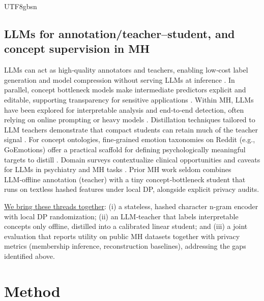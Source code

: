 \documentclass[lettersize,journal]{IEEEtran}
\begin{document}
\begin{CJK*}{UTF8}{gbsn}
\subsection{LLMs for annotation/teacher–student, and concept supervision in MH}
LLMs can act as high‑quality annotators and teachers, enabling low‑cost label generation and model compression without serving LLMs at inference \cite{gilardi2023chatgptannotators,tan2024llmannotationSurvey,hinton2015distilling}. In parallel, concept bottleneck models make intermediate predictors explicit and editable, supporting transparency for sensitive applications \cite{koh2020concept}. Within MH, LLMs have been explored for interpretable analysis and end‑to‑end detection, often relying on online prompting or heavy models \cite{yang2023interpretablellm,qin2023readdiagnosechat}. Distillation techniques tailored to LLM teachers demonstrate that compact students can retain much of the teacher signal \cite{dipalo2024pgkd}. For concept ontologies, fine‑grained emotion taxonomies on Reddit (e.g., GoEmotions) offer a practical scaffold for defining psychologically meaningful targets to distill \cite{demszky2020goemotions}. Domain surveys contextualize clinical opportunities and caveats for LLMs in psychiatry and MH tasks \cite{liu2024llmpsychiatry,xu2025benchmarkmhllm}. Prior MH work seldom combines LLM‑offline annotation (teacher) with a tiny concept‑bottleneck student that runs on textless hashed features under local DP, alongside explicit privacy audits. 

\underline{We bring these threads together}: (i) a stateless, hashed character n\mbox{-}gram encoder with local DP randomization; (ii) an LLM‑teacher that labels interpretable concepts only offline, distilled into a calibrated linear student; and (iii) a joint evaluation that reports utility on public MH datasets together with privacy metrics (membership inference, reconstruction baselines), addressing the gaps identified above.


\section{Method}
\label{sec:method}


\end{CJK*}
\end{document}
